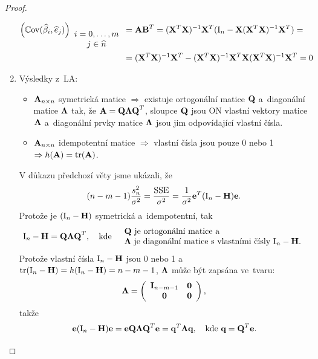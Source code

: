 \begin{proof}
\begin{enumerate}
 \begin{align*}
 \left(\mathbb{C}\mathrm{ov}(\widehat{\beta}_i, \widehat{e}_j) \right)_{ \begin{array}{c}
 i = 0,\dots, m \\
 j  \in\widehat{n}
 \end{array} } & = \textbf{A} \textbf{B}^T
 = (\mathbf{X}^T \mathbf{X})^{-1} \mathbf{X}^T (\text{I}_n - \mathbf{X} (\mathbf{X}^T \mathbf{X})^{-1} \mathbf{X}^T) = \\
& = (\mathbf{X}^T \mathbf{X})^{-1} \mathbf{X}^T - (\mathbf{X}^T \mathbf{X})^{-1} \mathbf{X}^T \mathbf{X} (\mathbf{X}^T \mathbf{X})^{-1} \mathbf{X}^T = 0
 \end{align*}
 
\item Výsledky z~LA:
\begin{itemize}
\item $\textbf{A}_{n \times n}$ symetrická matice $\Rightarrow$ existuje ortogonální matice $\textbf{Q}$ a~diagonální matice $\mathbf{\Lambda}$ tak, že $\textbf{A} = \textbf{Q} \mathbf{\Lambda} \textbf{Q}^T$, sloupce $\textbf{Q}$ jsou ON vlastní vektory matice $\textbf{A}$ a~diagonální prvky matice $\mathbf{\Lambda}$ jsou jim odpovídající vlastní čísla.
\item $\textbf{A}_{n \times n}$ idempotentní matice $\Rightarrow$ vlastní čísla jsou pouze 0 nebo 1 $\Rightarrow h(\textbf{A}) = \mathrm{tr}(\textbf{A})$.
\end{itemize}
V důkazu předchozí věty jsme ukázali, že
$$(n - m -1) \frac{s_n^2}{\sigma^2} = \frac{\mathrm{SSE}}{\sigma^2} = \frac{1}{\sigma^2} \mathbf{e}^T (\text{I}_n - \textbf{H}) \mathbf{e}.$$
Protože je $(\text{I}_n - \textbf{H})$ symetrická a~idempotentní, tak
 $$
 \text{I}_n - \textbf{H} = \textbf{Q} \mathbf{\Lambda} \textbf{Q}^T,  \quad \text{kde} \quad
 \begin{array}{l}
 {\textbf{Q}\text{ je ortogonální matice a}} \\
{\mathbf{\Lambda}  \text{ je diagonální matice s~vlastními čísly } \text{I}_n - \textbf{H}}.
 \end{array}
 $$
Protože vlastní čísla $\text{I}_n - \textbf{H}$ jsou 0 nebo 1 a~$\mathrm{tr}(\text{I}_n - \textbf{H}) = h(\text{I}_n - \textbf{H}) = n - m - 1$, \linebreak
 $\mathbf{\Lambda}$ může být zapsána ve~tvaru:
 $$
 \mathbf{\Lambda} = 
 \left(\begin{array}{cc}
 \textbf{I}_{n-m-1} & \boldsymbol{0}  \\
 \boldsymbol{0} & \boldsymbol{0}
 \end{array} \right),
 $$
takže
 $$
 \mathbf{e} (\text{I}_n - \textbf{H}) \mathbf{e} = \mathbf{e} \textbf{Q} \mathbf{\Lambda} \textbf{Q}^T \mathbf{e} = \textbf{q}^T \mathbf{\Lambda} \textbf{q}, \quad \text{kde } \textbf{q} = \textbf{Q}^T \mathbf{e}.
 $$
 

\end{enumerate}
\end{proof}
